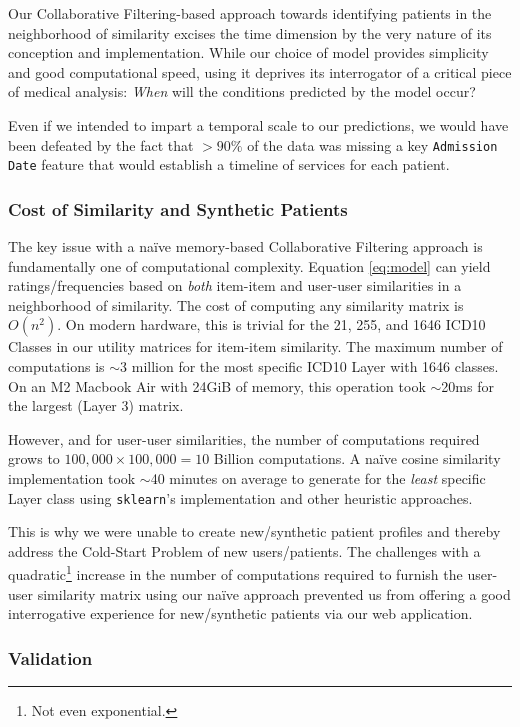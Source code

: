 \documentclass[twoside,11pt]{article}
\begin{document}
{Our Collaborative Filtering-based approach towards identifying patients in the neighborhood of similarity excises the time dimension by the very nature of its conception and implementation. While our choice of model provides simplicity and good computational speed, using it deprives its interrogator of a critical piece of medical analysis: \textit{When} will the conditions predicted by the model occur?

Even if we intended to impart a temporal scale to our predictions, we would have been defeated by the fact that $>90\%$ of the data was missing a key \texttt{Admission Date} feature that would establish a timeline of services for each patient.

\subsubsection*{Cost of Similarity and Synthetic Patients}

The key issue with a na{\"i}ve memory-based Collaborative Filtering approach is fundamentally one of computational complexity. Equation \ref{eq:model} can yield ratings/frequencies based on \textit{both} item-item and user-user similarities in a neighborhood of similarity. The cost of computing any similarity matrix is $O(n^2)$. On modern hardware, this is trivial for the 21, 255, and 1646 ICD10 Classes in our utility matrices for item-item similarity. The maximum number of computations is $\sim$3 million for the most specific ICD10 Layer with 1646 classes. On an M2 Macbook Air with 24GiB of memory, this operation took $\sim$20ms for the largest (Layer 3) matrix.

However, and for user-user similarities, the number of computations required grows to $100,000 \times 100,000 = 10$ Billion computations. A na{\"i}ve cosine similarity implementation took $\sim$40 minutes on average to generate for the \textit{least} specific Layer class using \texttt{sklearn}'s implementation and other heuristic approaches.

This is why we were unable to create new/synthetic patient profiles and thereby address the Cold-Start Problem of new users/patients. The challenges with a quadratic\footnote{Not even exponential.} increase in the number of computations required to furnish the user-user similarity matrix using our na{\"i}ve approach prevented us from offering a good interrogative experience for new/synthetic patients via our web application.

\subsubsection*{Validation}

}
\end{document}
